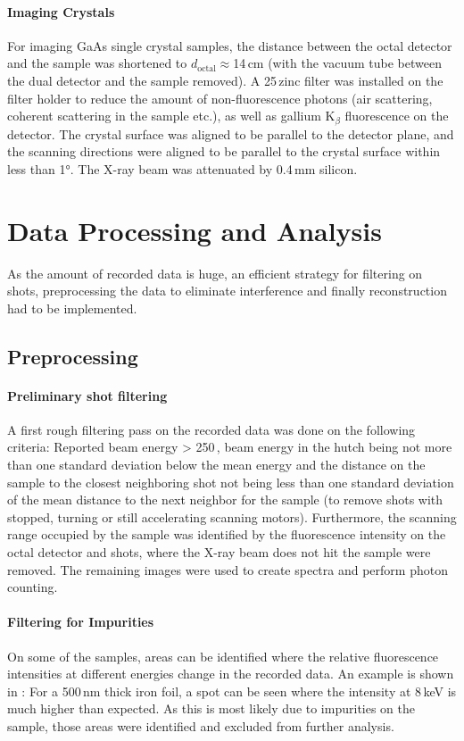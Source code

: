\paragraph{Imaging Crystals}
For imaging GaAs single crystal samples, the distance between the octal detector and the sample was shortened to $d_\text{octal}\approx$14\,cm (with the vacuum tube between the dual detector and the sample removed). A 25\,\micrometer zinc filter was installed on the filter holder to reduce the amount of non-fluorescence photons (air scattering, coherent scattering in the sample etc.), as well as gallium K$_\beta$ fluorescence on the detector. The crystal surface was aligned to be parallel to the detector plane, and the scanning directions were aligned to be parallel to the crystal surface within less than 1°. The X-ray beam was attenuated by 0.4\,mm silicon.

\section{Data Processing and Analysis}
As the amount of recorded data is huge, an efficient strategy for filtering on shots, preprocessing the data to eliminate interference and finally reconstruction had to be implemented.
\subsection{Preprocessing}

\paragraph{Preliminary shot filtering}
A first rough filtering pass on the recorded data was done on the following criteria: Reported beam energy > 250\,\microjoule, beam energy in the hutch being not more than one standard deviation below the mean energy and the distance on the sample to the closest neighboring shot not being less than one standard deviation of the mean distance to the next neighbor for the sample (to remove shots with stopped, turning or still accelerating scanning motors). Furthermore, the scanning range occupied by the sample was identified by the fluorescence intensity on the octal detector and shots, where the X-ray beam does not hit the sample were removed. The remaining images were used to create spectra and perform photon counting.


\paragraph{Filtering for Impurities}
On some of the samples, areas can be identified where the relative fluorescence intensities at different energies change in the recorded data. An example is shown in : For a 500\,nm thick iron foil, a spot can be seen where the intensity at 8\,keV is much higher than expected. As this is most likely due to impurities on the sample, those areas were identified and excluded from further analysis.

